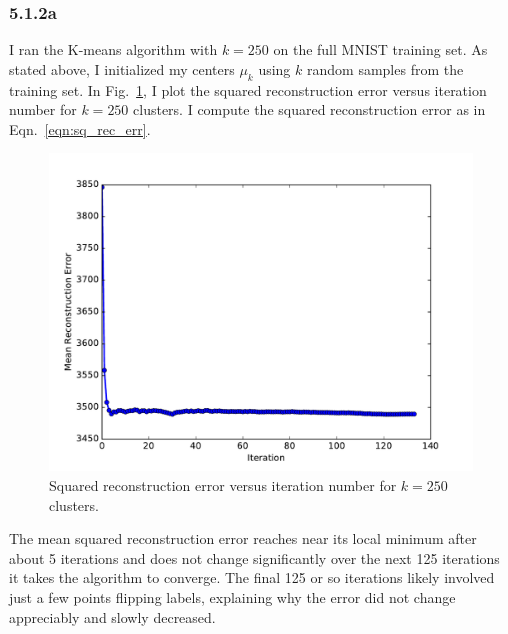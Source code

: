 \documentclass[12pt]{amsart}
\begin{document}
\subsubsection*{5.1.2a}
I ran the K-means algorithm with $k = 250$ on the full MNIST training set.  As stated above, I initialized my centers $\mu_k$ using $k$ random samples from the training set.  In Fig.~\ref{fig:k_250_rec_err}, I plot the squared reconstruction error versus iteration number for $k = 250$ clusters.  I compute the squared reconstruction error as in Eqn.~\ref{eqn:sq_rec_err}.
\begin{figure}[H]
	\includegraphics[width=\columnwidth]{k_250_rec_err.pdf}
    \caption{Squared reconstruction error versus iteration number for $k = 250$ clusters.}
    \label{fig:k_250_rec_err}
\end{figure}
The mean squared reconstruction error reaches near its local minimum after about 5 iterations and does not change significantly over the next 125 iterations it takes the algorithm to converge.  The final 125 or so iterations likely involved just a few points flipping labels, explaining why the error did not change appreciably and slowly decreased.
\end{document}
